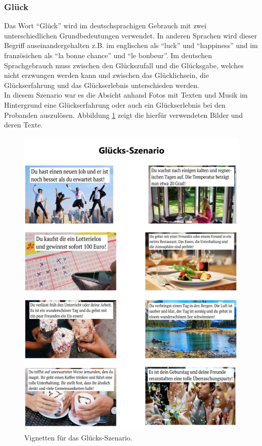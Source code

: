 \subsubsection{Gl{\"u}ck} \label{glueck-1}


Das Wort ``Gl{\"u}ck'' wird im deutschsprachigen Gebrauch mit zwei unterschiedlichen Grundbedeutungen verwendet. 
In anderen Sprachen wird dieser Begriff auseinandergehalten z.B. im englischen als ``luck'' und ``happiness'' und im franz{\"o}sichen als ``la bonne chance'' und ``le bonbeur''.
Im deutschen Sprachgebrauch muss zwischen den Gl{\"u}ckszufall und die Gl{\"u}cksgabe, welches nicht erzwungen werden kann und zwischen das Gl{\"u}cklichsein, die Gl{\"u}ckserfahrung und das Gl{\"u}ckserlebnis unterschieden werden\cite{bien19}. \\

In diesem Szenario war es die Absicht anhand Fotos mit Texten und Musik im Hintergrund eine Gl{\"u}ckserfahrung oder auch ein Gl{\"u}ckserlebnis bei den Probanden auszul{\"o}sen.
Abbildung \ref{fig-glueck} zeigt die hierf{\"u}r verwendeten Bilder und deren Texte. \\

\begin{figure}[H] \centering
\includegraphics[width=12cm]{Images/gluck.png} 
\vspace{-0.3cm} 
\caption{Vignetten f{\"u}r das Gl{\"u}cks-Szenario.}
\label{fig-glueck} 
\end{figure}

